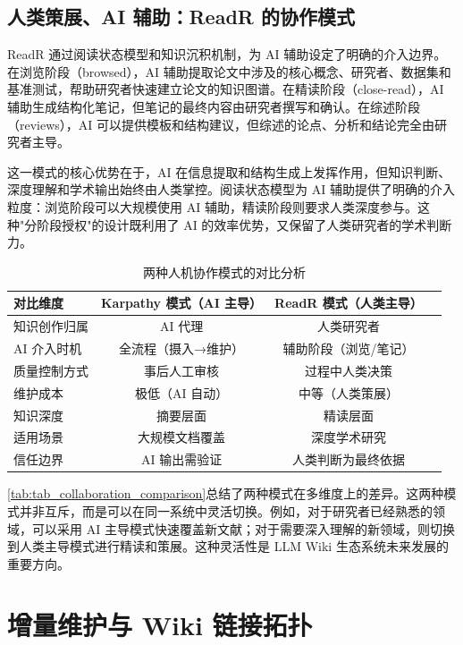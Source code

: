 \documentclass[11pt, a4paper, nonumbering]{SciMasterNoBrand}
\begin{document}
\subsection{人类策展、AI 辅助：ReadR 的协作模式}

ReadR 通过阅读状态模型和知识沉积机制，为 AI 辅助设定了明确的介入边界\cite{woo2026readr}。在浏览阶段（browsed），AI 辅助提取论文中涉及的核心概念、研究者、数据集和基准测试，帮助研究者快速建立论文的知识图谱。在精读阶段（close-read），AI 辅助生成结构化笔记，但笔记的最终内容由研究者撰写和确认。在综述阶段（reviews），AI 可以提供模板和结构建议，但综述的论点、分析和结论完全由研究者主导。

这一模式的核心优势在于，AI 在信息提取和结构生成上发挥作用，但知识判断、深度理解和学术输出始终由人类掌控\cite{dritjongruda2024}。阅读状态模型为 AI 辅助提供了明确的介入粒度：浏览阶段可以大规模使用 AI 辅助，精读阶段则要求人类深度参与。这种"分阶段授权"的设计既利用了 AI 的效率优势，又保留了人类研究者的学术判断力。

\begin{table}[H]
  \centering
  \caption{两种人机协作模式的对比分析\label{tab:tab_collaboration_comparison}}
  \begin{tabularx}{\textwidth}{LCCC}
    \toprule
    对比维度 & Karpathy 模式（AI 主导） & ReadR 模式（人类主导） \\
    \midrule
    知识创作归属 & AI 代理 & 人类研究者 \\
    AI 介入时机 & 全流程（摄入→维护） & 辅助阶段（浏览/笔记） \\
    质量控制方式 & 事后人工审核 & 过程中人类决策 \\
    维护成本 & 极低（AI 自动） & 中等（人类策展） \\
    知识深度 & 摘要层面 & 精读层面 \\
    适用场景 & 大规模文档覆盖 & 深度学术研究 \\
    信任边界 & AI 输出需验证 & 人类判断为最终依据 \\
    \bottomrule
  \end{tabularx}
\end{table}

\autoref{tab:tab_collaboration_comparison}总结了两种模式在多维度上的差异。这两种模式并非互斥，而是可以在同一系统中灵活切换。例如，对于研究者已经熟悉的领域，可以采用 AI 主导模式快速覆盖新文献；对于需要深入理解的新领域，则切换到人类主导模式进行精读和策展\cite{jeffreymperkel2020}。这种灵活性是 LLM Wiki 生态系统未来发展的重要方向。

\section{增量维护与 Wiki 链接拓扑}
\end{document}
